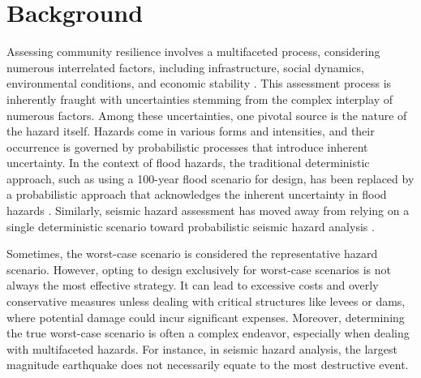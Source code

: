 \section{Background}
    Assessing community resilience involves a multifaceted process, considering numerous interrelated factors, including infrastructure, social dynamics, environmental conditions, and economic stability \cite{community_resilience_group_community_2015,community_resilience_group_community_2015-1}. This assessment process is inherently fraught with uncertainties stemming from the complex interplay of numerous factors. Among these uncertainties, one pivotal source is the nature of the hazard itself. Hazards come in various forms and intensities, and their occurrence is governed by probabilistic processes that introduce inherent uncertainty. In the context of flood hazards, the traditional deterministic approach, such as using a 100-year flood scenario for design, has been replaced by a probabilistic approach that acknowledges the inherent uncertainty in flood hazards \cite{quagliolo_experimental_2021,bulti_community_2019,eslamian_flood_2023,winter_event_2020}. Similarly, seismic hazard assessment has moved away from relying on a single deterministic scenario \cite{tantala_earthquake_2008,cardona_seismic_1997,faccioli_study_1999} toward probabilistic seismic hazard analysis \cite{gerstenberger_probabilistic_2020,campbell_seismic_2002}. 
    
    Sometimes, the worst-case scenario is considered the representative hazard scenario. However, opting to design exclusively for worst-case scenarios is not always the most effective strategy. It can lead to excessive costs and overly conservative measures unless dealing with critical structures like levees or dams, where potential damage could incur significant expenses. Moreover, determining the true worst-case scenario is often a complex endeavor, especially when dealing with multifaceted hazards. For instance, in seismic hazard analysis, the largest magnitude earthquake does not necessarily equate to the most destructive event. 

 
